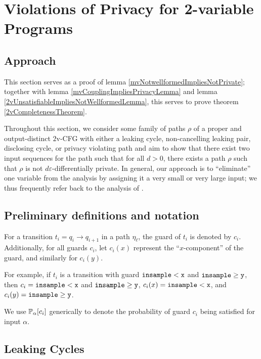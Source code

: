 \section{Violations of Privacy for 2-variable Programs}

\subsection{Approach}

This section serves as a proof of lemma \ref{mvNotwellformedImpliesNotPrivate}; together with lemma \ref{mvCouplingImpliesPrivacyLemma} and lemma \ref{2vUnsatisfiableImpliesNotWellformedLemma}, this serves to prove theorem \ref{2vCompletenessTheorem}.


Throughout this section, we consider some family of paths $\rho$ of a proper and output-distinct $2$v-CFG with either a leaking cycle, non-cancelling leaking pair, disclosing cycle, or privacy violating path and aim to show that there exist two input sequences for the path such that for all $d>0$, there exists a path $\rho$ such that $\rho$ is not $d\varepsilon$-differentially private. 
In general, our approach is to ``eliminate'' one variable from the analysis by assigning it a very small or very large input; we thus frequently refer back to the analysis of \cite{chadhaLinearTimeDecidability2021}. 



\subsection{Preliminary definitions and notation}

\begin{defn}
	For a transition $t_i = q_i\to q_{i+1}$ in a path $\eta_\ell$, the guard of $t_i$ is denoted by $c_i$. Additionally, for all guards $c_i$, let $c_i(x)$ represent the ``$x$-component'' of the guard, and similarly for $c_i(y)$.
	
	For example, if $t_i$ is a transition with guard $\lguard[\texttt{x}]$ and $\gguard[\texttt{y}]$, then $c_i = \lguard[\texttt{x}]$ and $\gguard[\texttt{y}]$, $c_i(x)=\lguard[\texttt{x}]$, and $c_i(y)=\gguard[\texttt{y}]$.
	\end{defn}
	
We use $\PP_\alpha[c_i]$ generically to denote the probability of guard $c_i$ being satisfied for input $\alpha$.

\subsection{Leaking Cycles}

